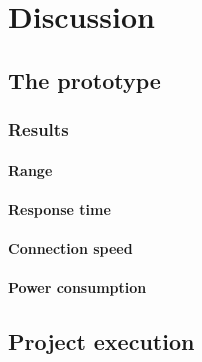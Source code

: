 \section{Discussion}

\subsection{The prototype}

\subsubsection{Results}

\paragraph{Range}

\paragraph{Response time}

\paragraph{Connection speed}

\paragraph{Power consumption}

\subsection{Project execution}
